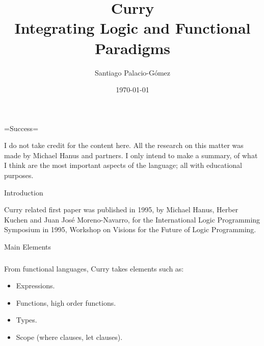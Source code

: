 \documentclass{beamer}
\title{Curry\\ Integrating Logic and Functional Paradigms}
\author{Santiago Palacio-Gómez}
\institute{Universidad EAFIT\\Seminario de L\'ogica y Computaci\'on}
\date{\today}
\begin{document}
=Success=
\begin{frame}
  \titlepage
\end{frame}



\begin{frame}
  I do not take credit for the content here. All the research on this matter was made by Michael Hanus and partners. I only intend to make a summary, of what I think are the most important aspects of the language; all with educational purposes.
\end{frame}
\begin{frame}[allowframebreaks]
  \tableofcontents
\end{frame}


\begin{section}{Introduction}
  
  \begin{frame}
    Curry related first paper was published in 1995, by Michael Hanus, Herber Kuchen and Juan Jos\'e Moreno-Navarro, for the International Logic Programming Symposium in 1995, Workshop on Visions for the Future of Logic Programming.
  \end{frame}
\end{section}



\begin{section}{Main Elements}
\begin{frame}
\frametitle{\secname}
  From functional languages, Curry takes elements such as:
\begin{itemize}
  \item Expressions.
  \item Functions, high order functions.
  \item Types.
  \item Scope (where clauses, let clauses).
\end{itemize}
\end{frame}
\end{section}
\end{document}
